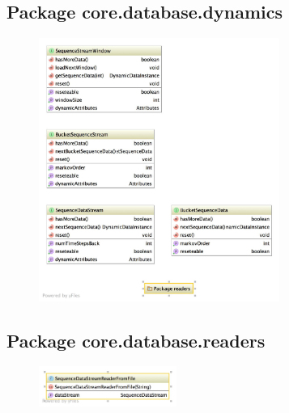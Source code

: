 \subsection{Package core.database.dynamics}
\begin{figure}[H]
  \centering
    \includegraphics[width=0.7\textwidth]{ClassDiagrams/core_database_dynamics.jpg}
\end{figure}

\subsection{Package core.database.readers}
\begin{figure}[H]
  \centering
    \includegraphics[width=0.4\textwidth]{ClassDiagrams/core_database_dynamics_readers.jpg}
\end{figure}

